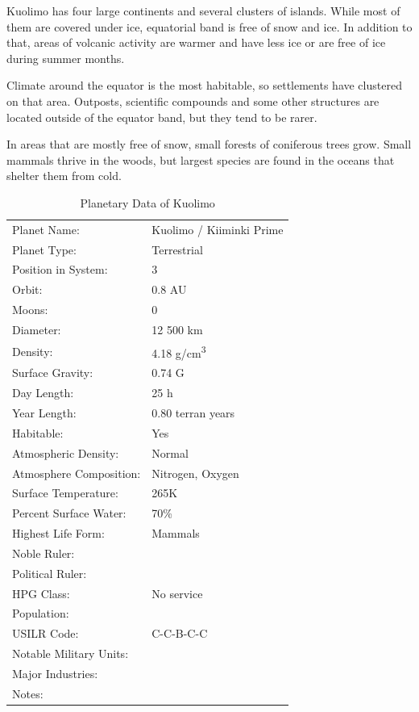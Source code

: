 \documentclass{tufte-book}
\begin{document}
Kuolimo has four large continents and several clusters of islands. While
most of them are covered under ice, equatorial band is free of snow and
ice. In addition to that, areas of volcanic activity are warmer and have
less ice or are free of ice during summer months.

Climate around the equator is the most habitable, so settlements have
clustered on that area. Outposts, scientific compounds and some other
structures are located outside of the equator band, but they tend to
be rarer.

In areas that are mostly free of snow, small forests of coniferous trees grow.
Small mammals thrive in the woods, but largest species are found in the oceans
that shelter them from cold.


\bigskip
\begin{table}
\begin{minipage}{\textwidth}
\begin{center}
\begin{tabular}{ll}
\toprule
Planet Name: & Kuolimo / Kiiminki Prime \\
Planet Type: & Terrestrial \\
Position in System: & 3 \\
Orbit: & 0.8 AU \\
Moons: & 0 \\
Diameter: & 12 500 km \\
Density: & 4.18 g/cm\textsuperscript{3} \\
Surface Gravity: & 0.74 G \\
Day Length: & 25 h \\
Year Length: & 0.80 terran years \\
Habitable: & Yes \\
\quad Atmospheric Density: & Normal \\
\quad Atmosphere Composition: & Nitrogen, Oxygen \\
\quad Surface Temperature: & 265K \\
\quad Percent Surface Water: & 70\% \\
\quad Highest Life Form: & Mammals \\
\toprule
Noble Ruler: & \\
Political Ruler: & \\
HPG Class: & No service \\
Population: & \\
USILR Code: & C-C-B-C-C \\
Notable Military Units: & \\
Major Industries: & \\
Notes: & \\

\bottomrule
\end{tabular}
\end{center}
\end{minipage}
\caption{Planetary Data of Kuolimo}
\end{table}
\end{document}
